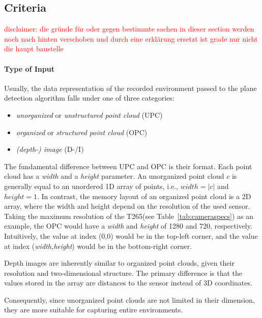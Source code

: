 \documentclass[main.tex]{subfiles}
\begin{document}
\subsection{Criteria}
\textcolor{red}{disclaimer: die gründe für oder gegen bestimmte sachen in dieser section werden noch nach hinten verschoben und durch eine erklärung ersetzt ist grade nur nicht die haupt baustelle}
\paragraph{Type of Input}\label{par:input}
Usually, the data representation of the recorded environment passed to the plane detection algorithm falls under one of three categories:
\begin{itemize}
    \item \textit{unorganized} or \textit{unstructured point cloud} (UPC)
    \item \textit{organized} or \textit{structured point cloud} (OPC)
    \item \textit{(depth-) image} (D-/I)
\end{itemize}

The fundamental difference between UPC and OPC is their format. Each point cloud has a \textit{width} and a \textit{height} parameter.
An unorganized point cloud $c$ is generally equal to an unordered 1D array of points, i.e., $width = |c|$ and $height=1$.
In contrast, the memory layout of an organized point cloud is a 2D array, where the width and height depend on the resolution of the used sensor.
Taking the maximum resolution of the T265(see Table~\ref{tab:cameraspecs}) as an example, the OPC would have a \textit{width} and \textit{height} of
1280 and 720, respectively.
Intuitively, the value at index (0,0) would be in the top-left corner, and the value at index (\textit{width,height}) would be in the bottom-right corner.

Depth images are inherently similar to organized point clouds, given their resolution and two-dimensional structure. The primary difference is that the values
stored in the array are distances to the sensor instead of 3D coordinates.

Consequently, since unorganized point clouds are not limited in their dimension, they are more suitable for capturing entire environments.
\end{document}
